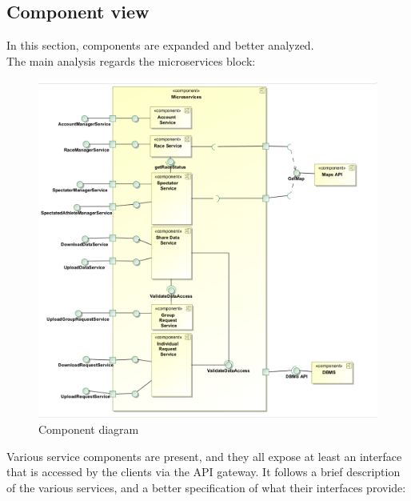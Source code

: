 \subsection{Component view}
In this section, components are expanded and better analyzed. \\
The main analysis regards the microservices block: 
\begin{figure}[H]
\includegraphics[width=\linewidth]{Images/componentdiagram.pdf}
\caption{ Component diagram }
\label{fig:world2}
\end{figure}
Various service components are present, and they all expose at least an interface that is accessed by the
clients via the API gateway. It follows a brief description of the various services, and a better
specification of what their interfaces provide:
